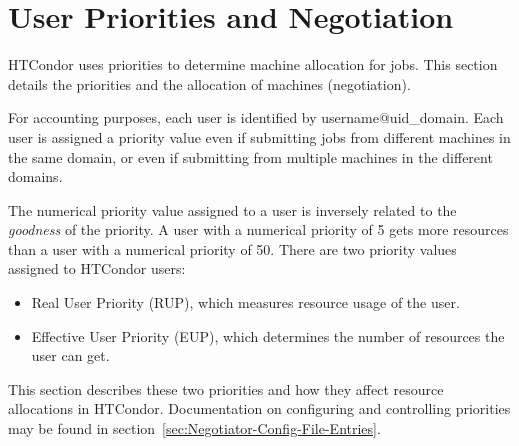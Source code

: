 \section{User Priorities and Negotiation}\label{sec:UserPrio}



HTCondor uses priorities to determine machine allocation for jobs.
This section details the priorities and the allocation of
machines (negotiation).

For accounting purposes, each user is identified by username@uid\_domain.
Each user is assigned a priority value even if submitting jobs from
different machines in the same domain, or even if submitting from multiple
machines in the different domains.

The numerical priority value assigned to a user is inversely related to the 
\emph{goodness} of the priority.
A user with a numerical priority of 5 gets 
more resources than a user with a numerical priority of 50.
There are two 
priority values assigned to HTCondor users:
\begin{itemize}
	\item Real User Priority (RUP), which measures resource usage of the 
		user.
	\item Effective User Priority (EUP), which determines the number of
		resources the user can get.
\end{itemize}
This section describes these two priorities and how they affect resource
allocations in HTCondor.
Documentation on configuring and controlling 
priorities may be found in section~\ref{sec:Negotiator-Config-File-Entries}.

